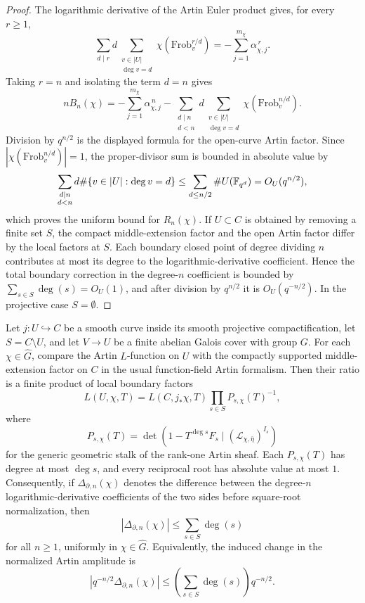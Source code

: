 \begin{proof}
The logarithmic derivative of the Artin Euler product gives, for every \(r\ge1\),
\[
\sum_{d\mid r}d\sum_{\substack{v\in |U|\\ \deg v=d}}
\chi\!\left(\mathrm{Frob}_v^{r/d}\right)
=
-\sum_{j=1}^{m_\chi}\alpha_{\chi,j}^{\,r}.
\]
Taking \(r=n\) and isolating the term \(d=n\) gives
\[
nB_n(\chi)
=
-\sum_{j=1}^{m_\chi}\alpha_{\chi,j}^{\,n}
-
\sum_{\substack{d\mid n\\ d<n}}
 d\sum_{\substack{v\in |U|\\ \deg v=d}}
 \chi\!\left(\mathrm{Frob}_v^{n/d}\right).
\]
Division by \(q^{n/2}\) is the displayed formula for the open-curve Artin factor. Since \(|\chi(\mathrm{Frob}_v^{n/d})|=1\), the proper-divisor sum is bounded in absolute value by
\[
\sum_{\substack{d\mid n\\d<n}}d\#\{v\in |U|:\deg v=d\}
\le
\sum_{d\le n/2}\#U(\mathbb{F}_{q^d})
=O_U(q^{n/2}),
\]
which proves the uniform bound for \(R_n(\chi)\). If \(U\subset C\) is obtained by removing a finite set \(S\), the compact middle-extension factor and the open Artin factor differ by the local factors at \(S\). Each boundary closed point of degree dividing \(n\) contributes at most its degree to the logarithmic-derivative coefficient. Hence the total boundary correction in the degree-\(n\) coefficient is bounded by \(\sum_{s\in S}\deg(s)=O_U(1)\), and after division by \(q^{n/2}\) it is \(O_U(q^{-n/2})\). In the projective case \(S=\emptyset\).
\end{proof}

\begin{lemma}\label{lem:finite-field-boundary-euler-factor-comparison}
Let \(j:U\hookrightarrow C\) be a smooth curve inside its smooth projective compactification, let \(S=C\setminus U\), and let \(V\to U\) be a finite \etale{} abelian Galois cover with group \(G\). For each \(\chi\in\widehat G\), compare the Artin \(L\)-function on \(U\) with the compactly supported middle-extension factor on \(C\) in the usual function-field Artin formalism. Then their ratio is a finite product of local boundary factors
\[
L(U,\chi,T)=L(C,j_\ast\chi,T)
\prod_{s\in S}P_{s,\chi}(T)^{-1},
\]
where
\[
P_{s,\chi}(T)=
\det\!\left(1-T^{\deg s}F_s\mid(\mathcal L_{\chi,\bar\eta})^{I_s}\right)
\]
for the generic geometric stalk of the rank-one Artin sheaf.  Each
\(P_{s,\chi}(T)\) has degree at most \(\deg s\), and every reciprocal root has
absolute value at most \(1\). Consequently, if \(\Delta_{\partial,n}(\chi)\)
denotes the difference between the degree-\(n\) logarithmic-derivative
coefficients of the two sides before square-root normalization, then
\[
|\Delta_{\partial,n}(\chi)|
\le \sum_{s\in S}\deg(s)
\]
for all \(n\ge1\), uniformly in \(\chi\in\widehat G\). Equivalently, the induced change in the normalized Artin amplitude is
\[
\left|q^{-n/2}\Delta_{\partial,n}(\chi)\right|
\le \left(\sum_{s\in S}\deg(s)\right)q^{-n/2}.
\]
\end{lemma}

